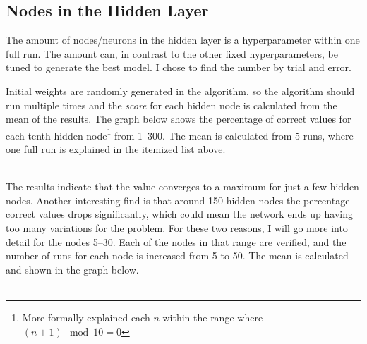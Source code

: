 \documentclass{article}
\begin{document}
\subsection*{Nodes in the Hidden Layer}

The amount of nodes/neurons in the hidden layer is a hyperparameter within one full run. The amount can, in contrast to the other fixed hyperparameters, be tuned to generate the best model. I chose to find the number by trial and error.

Initial weights are randomly generated in the algorithm, so the algorithm should run multiple times and the \emph{score} for each hidden node is calculated from the mean of the results. The graph below shows the percentage of correct values for each tenth hidden node\footnote{More formally explained each $n$ within the range where $(n + 1)\mod{10} = 0$} from 1--300. The mean is calculated from 5 runs, where one full run is explained in the itemized list above.\\\\


\noindent The results indicate that the value converges to a maximum for just a few hidden nodes. Another interesting find is that around 150 hidden nodes the percentage correct values drops significantly, which could mean the network ends up having too many variations for the problem. For these two reasons, I will go more into detail for the nodes 5--30. Each of the nodes in that range are verified, and the number of runs for each node is increased from 5 to 50. The mean is calculated and shown in the graph below.\\\\
\end{document}
